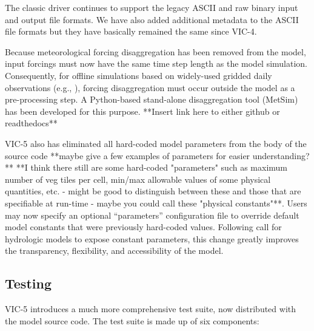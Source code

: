 \documentclass[gmd, manuscript]{copernicus}
\begin{document}
    The classic driver continues to support the legacy ASCII and raw binary input and output file formats. We have also added additional metadata to the ASCII file formats but they have basically remained the same since VIC-4.

    Because meteorological forcing disaggregation has been removed from the model, input forcings must now have the same time step length as the model simulation.  Consequently, for offline simulations based on widely-used gridded daily observations (e.g., \citep{Livneh_2015}), forcing disaggregation must occur outside the model as a pre-processing step.  A Python-based stand-alone disaggregation tool (MetSim) has been developed for this purpose. **Insert link here to either github or readthedocs**

    VIC-5 also has eliminated all hard-coded model parameters from the body of the source code **maybe give a few examples of parameters for easier understanding?** **I think there still are some hard-coded "parameters" such as maximum number of veg tiles per cell, min/max allowable values of some physical quantities, etc. - might be good to distinguish between these and those that are specifiable at run-time - maybe you could call these "physical constants"**. Users may now specify an optional ``parameters'' configuration file to override default model constants that were previously hard-coded values. Following \citet{Mendoza_2015} call for hydrologic models to expose constant parameters, this change greatly improves the transparency, flexibility, and accessibility of the model.

  \subsection{Testing}
    \label{sec:testing}
    VIC-5 introduces a much more comprehensive test suite, now distributed with the model source code. The test suite is made up of six components:
\end{document}
